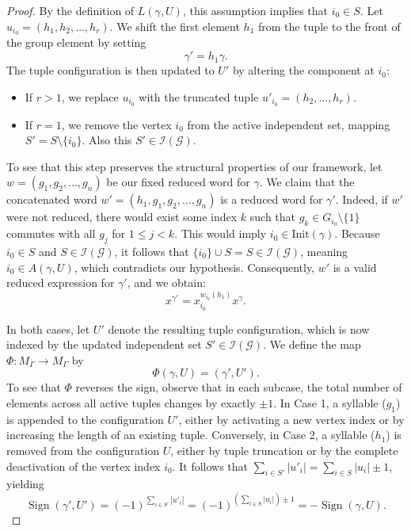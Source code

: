 \documentclass[10pt,a4paper]{amsart}
\begin{document}
\begin{proof}
    \item[Case 2: $i_0 \notin A(\gamma,U)$.] 
    By the definition of $L(\gamma, U)$, this assumption implies that $i_0 \in S$. Let $u_{i_0} = (h_1, h_2, \dots, h_r)$. We shift the first element $h_1$ from the tuple to the front of the group element by setting 
    \begin{equation*}
        \gamma' = h_1\gamma.
    \end{equation*}
    The tuple configuration is then updated to $U'$ by altering the component at $i_0$:
    \begin{itemize}
        \item If $r > 1$, we replace $u_{i_0}$ with the truncated tuple $u'_{i_0} = (h_2, \dots, h_r)$.
        \item If $r = 1$, we remove the vertex $i_0$ from the active independent set, mapping $S' = S \setminus \{i_0\}$. Also this $S'\in \mathcal{I(G)}$.
    \end{itemize}
    To see that this step preserves the structural properties of our framework, let $w = (g_1, g_2, \dots, g_n)$ be our fixed reduced word for $\gamma$. We claim that the concatenated word $w' = (h_1, g_1, g_2, \dots, g_n)$ is a reduced word for $\gamma'$. Indeed, if $w'$ were not reduced, there would exist some index $k$ such that $g_k \in G_{i_0} \setminus \{1\}$ commutes with all $g_j$ for $1 \le j < k$. This would imply $i_0 \in \mathrm{Init}(\gamma)$. Because $i_0 \in S$ and $S \in  \mathcal I(\mathcal G)$, it follows that $\{i_0\} \cup S = S \in  \mathcal I(\mathcal G)$, meaning $i_0 \in A(\gamma,U)$, which  contradicts our hypothesis. Consequently, $w'$ is a valid reduced expression for $\gamma'$, and we obtain:
    \begin{equation*}
        x^{\gamma'} = x_{i_0}^{w_{i_0}(h_1)} x^\gamma.
    \end{equation*}


In both cases, let $U'$ denote the resulting tuple configuration, which is now indexed by the updated independent set $S' \in \mathcal{I}(\mathcal{G})$. We define the map $\Phi:M_\Gamma\to M_\Gamma$ by 
\begin{equation*}
    \Phi(\gamma,U) = (\gamma',U').
\end{equation*}
To see that $\Phi$ reverses the sign, observe that in each subcase, the total number of elements across all active tuples changes by exactly $\pm 1$. In Case 1, a syllable ($g_1$) is appended to the configuration $U'$, either by activating a new vertex index or by increasing the length of an existing tuple. Conversely, in Case 2, a syllable ($h_1$) is removed from the configuration $U$, either by tuple truncation or by the complete deactivation of the vertex index $i_0$. It follows that $\sum_{i \in S'} |u'_i| = \sum_{i \in S} |u_i| \pm 1$, yielding
\begin{equation*}
\operatorname{Sign}(\gamma',U') = (-1)^{\sum_{i \in S'} |u'_i|} = (-1)^{\left(\sum_{i \in S} |u_i|\right) \pm 1} = -\operatorname{Sign}(\gamma,U).
\end{equation*}


\end{proof}
\end{document}
